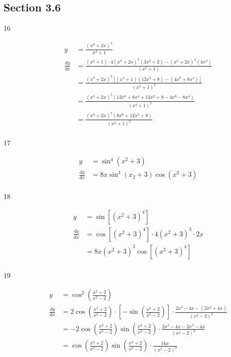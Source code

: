 \documentclass{exam}
\begin{document}
\subsection{Section 3.6}

\begin{description}


\item[16]
\begin{align*}
  y &= \frac{(x^3 + 2x)^4}{x^4 + 1} \\
  \frac{dy}{dx} &= \frac{(x^4 + 1) \cdot 4(x^3 + 2x)^3(3x^2 + 2) - (x^3 + 2x)^4(4x^3)}{(x^4 + 1)} \\
  &= \frac{ (x^3 + 2x)^3 [ (x^4 + 1)(12x^2 + 8) - (4x^6 + 8x^4) ]}{(x^4 + 1)^2} \\
  &= \frac{ (x^3 + 2x)^3 (12x^6 + 8x^4 + 12x^2 + 8 - 4x^6 - 8x^4)}{(x^4 + 1)^2} \\
  &= \frac{ (x^3 + 2x)^3 (8x^6 + 12x^2 + 8 )}{(x^4 + 1)^2} \\
\end{align*}

\item[17]
\begin{align*}
  y  &= \sin^4(x^2 + 3) \\
  \frac{dy}{dx} &= 8x \sin^3(x_2 + 3) \cos(x^2 + 3) \\
\end{align*}

\item[18]
\begin{align*}
  y &= \sin [ (x^2 + 3)^4] \\
  \frac{dy}{dx} &= \cos [ (x^2 + 3)^4] \cdot 4(x^2 + 3)^3 \cdot 2x \\
                &= 8x (x^2 + 3)^3 \cos [ (x^2 + 3)^4]  \\
\end{align*}

\item[19]
\begin{align*}
  y &= \cos^2 \left( \frac{x^2 + 2}{x^2 - 2} \right) \\
  \frac{dy}{dx} &= 2 \cos \left( \frac{x^2 + 2}{x^2 - 2} \right) 
    \cdot \left[ - \sin \left( \frac{x^2 + 2}{x^2 - 2} \right) \right] 
    \cdot \frac{2x^3 - 4x - (2x^3 + 4x)}{(x^2 - 2)^2} \\
  &= -2 \cos \left( \frac{x^2 + 2}{x^2 - 2} \right) 
    \sin \left( \frac{x^2 + 2}{x^2 - 2} \right) 
    \cdot \frac{2x^3 - 4x - 2x^3 - 4x}{(x^2 - 2)^2} \\
  &= \cos \left( \frac{x^2 + 2}{x^2 - 2} \right) 
     \sin \left( \frac{x^2 + 2}{x^2 - 2} \right) 
     \cdot \frac{16x}{(x^2 - 2)^2} \\
\end{align*}


\end{description}
\end{document}
